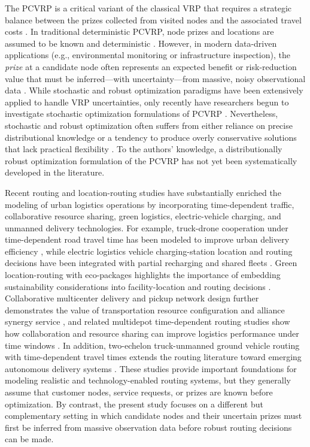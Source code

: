 \documentclass[preprint,12pt,authoryear]{elsarticle}
\theoremstyle{definition}
\begin{document}
The PCVRP is a critical variant of the classical VRP that requires a strategic balance between the prizes collected from visited nodes and the associated travel costs \citep{long2019hybrid,trachanatzi2020firefly,stenger2013prize}. In traditional deterministic PCVRP, node prizes and locations are assumed to be known and deterministic \citep{yu2026effective}. However, in modern data-driven applications (e.g., environmental monitoring or infrastructure inspection), the {\it prize} at a candidate node often represents an expected benefit or risk-reduction value that must be inferred---with uncertainty---from massive, noisy observational data \citep{yuan2026mitigate}. While stochastic and robust optimization paradigms have been extensively applied to handle VRP uncertainties, only recently have researchers begun to investigate stochastic optimization formulations of PCVRP \citep{pisinger2025stochastic}. Nevertheless, stochastic and robust optimization often suffers from either reliance on precise distributional knowledge or a tendency to produce overly conservative solutions that lack practical flexibility \citep{ota2025hardness,hoogeboom2021robust}. To the authors' knowledge, a distributionally robust optimization formulation of the PCVRP has not yet been systematically developed in the literature.


Recent routing and location-routing studies have substantially enriched the modeling of urban logistics operations by incorporating time-dependent traffic, collaborative resource sharing, green logistics, electric-vehicle charging, and unmanned delivery technologies. For example, truck-drone cooperation under time-dependent road travel time has been modeled to improve urban delivery efficiency \citep{wang2022truckdrone}, while electric logistics vehicle charging-station location and routing decisions have been integrated with partial recharging and shared fleets \citep{wang2026charging}. Green location-routing with eco-packages highlights the importance of embedding sustainability considerations into facility-location and routing decisions \citep{wang2020green}. Collaborative multicenter delivery and pickup network design further demonstrates the value of transportation resource configuration and alliance synergy service \citep{wang2026cmdpn}, and related multidepot time-dependent routing studies show how collaboration and resource sharing can improve logistics performance under time windows \citep{wang2024collaboration}. In addition, two-echelon truck-unmanned ground vehicle routing with time-dependent travel times extends the routing literature toward emerging autonomous delivery systems \citep{wei2025twoechelon}. These studies provide important foundations for modeling realistic and technology-enabled routing systems, but they generally assume that customer nodes, service requests, or prizes are known before optimization. By contrast, the present study focuses on a different but complementary setting in which candidate nodes and their uncertain prizes must first be inferred from massive observation data before robust routing decisions can be made.
\end{document}
